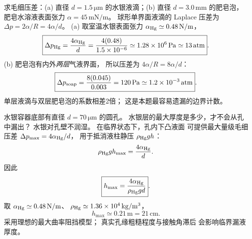 
求毛细压差：(a) 直径 $d=1.5\,\mathrm{\mu m}$
的水银液滴；(b) 直径 $d=3.0\,\mathrm{mm}$
的肥皂泡，肥皂水溶液表面张力
$\alpha=45\,\mathrm{mN/m}$。
\exsolution
球形单界面液滴的 Laplace 压差为
$\Delta p=2\alpha/R=4\alpha/d$。
(a) 取室温水银表面张力
$\alpha_{\rm Hg}\simeq0.48\,\mathrm{N/m}$，
\[
\boxed{\Delta p_{\rm Hg}=\frac{4\alpha_{\rm Hg}}d
=\frac{4(0.48)}{1.5\times10^{-6}}
\simeq1.28\times10^6\,\mathrm{Pa}
\simeq13\,\mathrm{atm}}.
\]
(b) 肥皂泡有内外\emph{两层}气液界面，
所以压差为 $4\alpha/R=8\alpha/d$：
\[
\boxed{\Delta p_{\rm soap}=\frac{8(0.045)}{0.003}
=120\,\mathrm{Pa}\simeq1.2\times10^{-3}\,\mathrm{atm}}.
\]
\excheck 单层液滴与双层肥皂泡的系数相差2倍；
这是本题最容易遗漏的边界计数。

水银容器底部有直径
$d=70\,\mathrm{\mu m}$ 的圆孔。
水银层的最大厚度是多少，才不会从孔中漏出？
\exsolution
水银对孔壁不润湿。
在临界状态下，孔内下凸液面
可提供最大量级毛细压差
$\Delta p_{\max}=4\alpha_{\rm Hg}/d$，
用于抵消液柱静压 $\rho_{\rm Hg}gh$：
\[
\rho_{\rm Hg}gh_{\max}=\frac{4\alpha_{\rm Hg}}d.
\]
因此
\[
\boxed{h_{\max}=\frac{4\alpha_{\rm Hg}}
{\rho_{\rm Hg}gd}}.
\]
取 $\alpha_{\rm Hg}\simeq0.48\,\mathrm{N/m}$、
$\rho_{\rm Hg}\simeq1.36\times10^4\,\mathrm{kg/m^3}$，
\[
\boxed{h_{\max}\simeq0.21\,\mathrm m=21\,\mathrm{cm}}.
\]
\excheck 采用理想的最大曲率阻挡模型；
真实孔缘粗糙程度与接触角滞后
会影响临界漏液厚度。

